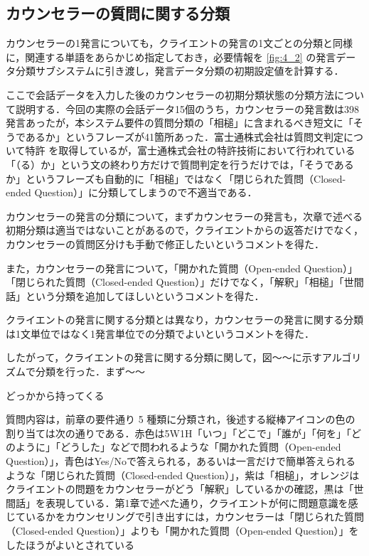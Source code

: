 \documentclass[shuuron]{kuee}
\begin{document}
\subsection{カウンセラーの質問に関する分類} %

カウンセラーの1発言についても，クライエントの発言の1文ごとの分類と同様に，関連する単語をあらかじめ指定しておき，必要情報を
\ref{fig:4_2}
の発言データ分類サブシステムに引き渡し，発言データ分類の初期設定値を計算する．

ここで会話データを入力した後のカウンセラーの初期分類状態の分類方法について説明する．今回の実際の会話データ15個のうち，カウンセラーの発言数は398発言あったが，本システム要件の質問分類の「相槌」に含まれるべき短文に「そうであるか」というフレーズが41箇所あった．富士通株式会社は質問文判定について特許
\cite{tokkyo}
を取得しているが，富士通株式会社の特許技術において行われている「（る）か」という文の終わり方だけで質問判定を行うだけでは，「そうであるか」というフレーズも自動的に「相槌」ではなく「閉じられた質問（Closed-ended Question）」に分類してしまうので不適当である．

カウンセラーの発言の分類について，まずカウンセラーの発言も，次章で述べる初期分類は適当ではないことがあるので，クライエントからの返答だけでなく，カウンセラーの質問区分けも手動で修正したいというコメントを得た．

また，カウンセラーの発言について，「開かれた質問（Open-ended Question）」「閉じられた質問（Closed-ended Question）」だけでなく，「解釈」「相槌」「世間話」という分類を追加してほしいというコメントを得た．

クライエントの発言に関する分類とは異なり，カウンセラーの発言に関する分類は1文単位ではなく1発言単位での分類でよいというコメントを得た．

したがって，クライエントの発言に関する分類に関して，図〜〜に示すアルゴリズムで分類を行った．まず〜〜

どっかから持ってくる


質問内容は，前章の要件通り 5 種類に分類され，後述する縦棒アイコンの色の割り当ては次の通りである．赤色は5W1H「いつ」「どこで」「誰が」「何を」「どのように」「どうした」などで問われるような「開かれた質問（Open-ended Question）」，青色はYes/Noで答えられる，あるいは一言だけで簡単答えられるような「閉じられた質問（Closed-ended Question）」，紫は「相槌」，オレンジはクライエントの問題をカウンセラーがどう「解釈」しているかの確認，黒は「世間話」を表現している．第1章で述べた通り，クライエントが何に問題意識を感じているかをカウンセリングで引き出すには，カウンセラーは「閉じられた質問（Closed-ended Question）」よりも「開かれた質問（Open-ended Question）」をしたほうがよいとされている
\end{document}
